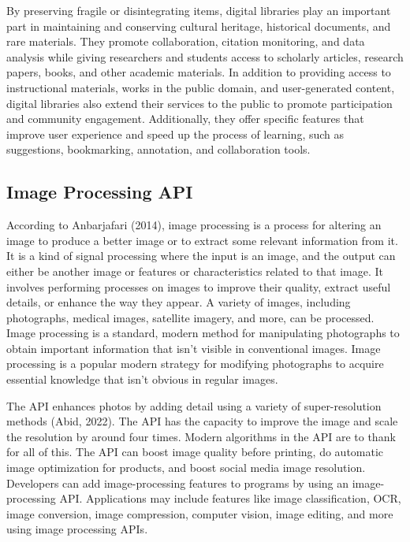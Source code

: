\hfill

By preserving fragile or disintegrating items, digital libraries play an important part in maintaining and conserving cultural heritage, historical documents, and rare materials. They promote collaboration, citation monitoring, and data analysis while giving researchers and students access to scholarly articles, research papers, books, and other academic materials. In addition to providing access to instructional materials, works in the public domain, and user-generated content, digital libraries also extend their services to the public to promote participation and community engagement. Additionally, they offer specific features that improve user experience and speed up the process of learning, such as suggestions, bookmarking, annotation, and collaboration tools.

\subsection*{Image Processing API}
\hspace\parindent
According to Anbarjafari (2014), image processing is a process for altering an image to produce a better image or to extract some relevant information from it. It is a kind of signal processing where the input is an image, and the output can either be another image or features or characteristics related to that image. It involves performing processes on images to improve their quality, extract useful details, or enhance the way they appear. A variety of images, including photographs, medical images, satellite imagery, and more, can be processed. Image processing is a standard, modern method for manipulating photographs to obtain important information that isn’t visible in conventional images. Image processing is a popular modern strategy for modifying photographs to acquire essential knowledge that isn't obvious in regular images.

\hfill

The API enhances photos by adding detail using a variety of super-resolution methods (Abid, 2022). The API has the capacity to improve the image and scale the resolution by around four times. Modern algorithms in the API are to thank for all of this. The API can boost image quality before printing, do automatic image optimization for products, and boost social media image resolution. Developers can add image-processing features to programs by using an image-processing API. Applications may include features like image classification, OCR, image conversion, image compression, computer vision, image editing, and more using image processing APIs.

